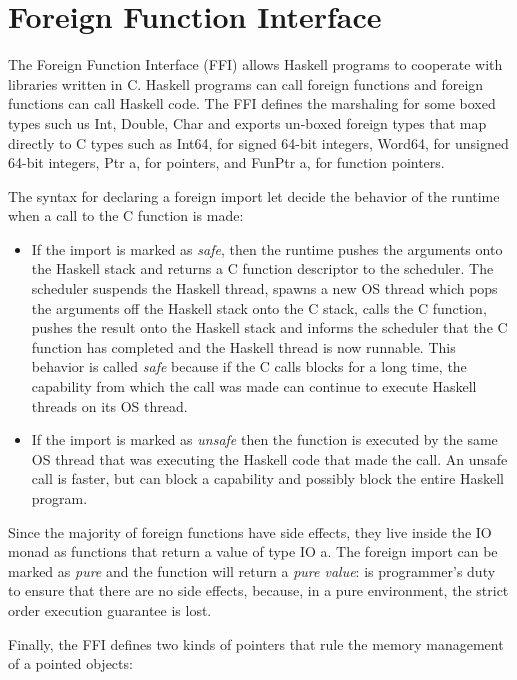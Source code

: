 \section{Foreign Function Interface}

The Foreign Function Interface (FFI) allows Haskell programs to cooperate with libraries written in C.
Haskell programs can call foreign functions and foreign functions can call Haskell code.
The FFI defines the marshaling for some boxed types such us Int, Double, Char and exports un-boxed foreign types that map directly to C types such as Int64, for signed 64-bit integers, Word64, for unsigned 64-bit integers, Ptr a, for pointers, and FunPtr a, for function pointers.

The syntax for declaring a foreign import let decide the behavior of the runtime when a call to the C function is made:
\begin{itemize}
\item If the import is marked as \emph{safe}, then the runtime pushes the arguments onto the Haskell stack and returns a C function descriptor to the scheduler.
The scheduler suspends the Haskell thread, spawns a new OS thread which pops the arguments off the Haskell stack onto the C stack, calls the C function, pushes the result onto the Haskell stack and informs the scheduler that the C function has completed and the Haskell thread is now runnable.
This behavior is called \emph{safe} because if the C calls blocks for a long time, the capability from which the call was made can continue to execute Haskell threads on its OS thread.
\item If the import is marked as \emph{unsafe} then the function is executed by the same OS thread that was executing the Haskell code that made the call. An unsafe call is faster, but can block a capability and possibly block the entire Haskell program.
\end{itemize}

Since the majority of foreign functions have side effects, they live inside the IO monad as functions that return a value of type IO a. The foreign import can be marked as \emph{pure} and the function will return a \emph{pure value}: is programmer's duty to ensure that there are no side effects, because, in a pure environment, the strict order execution guarantee is lost.

Finally, the FFI defines two kinds of pointers that rule the memory management of a pointed objects:

